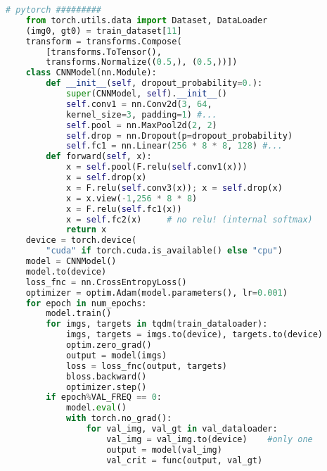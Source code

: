{\begin{lstlisting}[language=Python]
    # pytorch #########
    from torch.utils.data import Dataset, DataLoader
    (img0, gt0) = train_dataset[11]
    transform = transforms.Compose(
        [transforms.ToTensor(), 
        transforms.Normalize((0.5,), (0.5,))])
    class CNNModel(nn.Module):
        def __init__(self, dropout_probability=0.):
            super(CNNModel, self).__init__()
            self.conv1 = nn.Conv2d(3, 64, 
            kernel_size=3, padding=1) #...
            self.pool = nn.MaxPool2d(2, 2)
            self.drop = nn.Dropout(p=dropout_probability)       
            self.fc1 = nn.Linear(256 * 8 * 8, 128) #...
        def forward(self, x):
            x = self.pool(F.relu(self.conv1(x)))
            x = self.drop(x)
            x = F.relu(self.conv3(x)); x = self.drop(x)                
            x = x.view(-1,256 * 8 * 8)
            x = F.relu(self.fc1(x))
            x = self.fc2(x)     # no relu! (internal softmax)    
            return x
    device = torch.device(
        "cuda" if torch.cuda.is_available() else "cpu")
    model = CNNModel()
    model.to(device)
    loss_fnc = nn.CrossEntropyLoss()
    optimizer = optim.Adam(model.parameters(), lr=0.001)  
    for epoch in num_epochs:
        model.train()
        for imgs, targets in tqdm(train_dataloader):
            imgs, targets = imgs.to(device), targets.to(device)
            optim.zero_grad()
            output = model(imgs)
            loss = loss_fnc(output, targets)
            bloss.backward()
            optimizer.step()
        if epoch%VAL_FREQ == 0:
            model.eval()
            with torch.no_grad():
                for val_img, val_gt in val_dataloader:
                    val_img = val_img.to(device)    #only one
                    output = model(val_img)
                    val_crit = func(output, val_gt)      
\end{lstlisting}
}